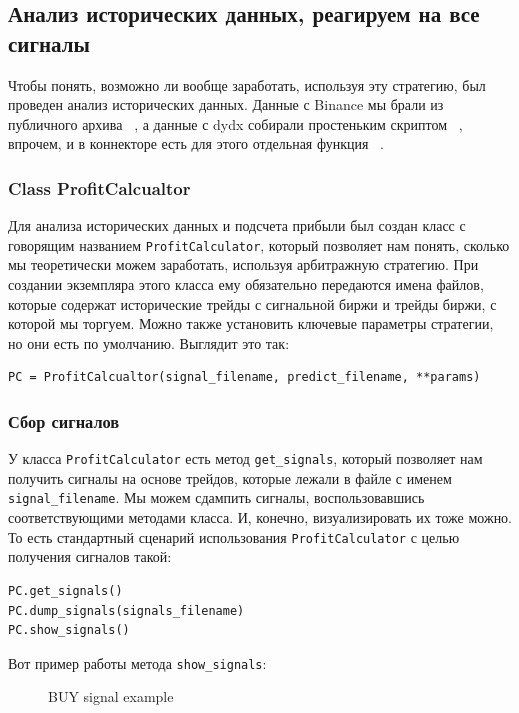 \subsection{Анализ исторических данных, реагируем на все сигналы}
Чтобы понять, возможно ли вообще заработать, используя эту стратегию, был проведен анализ исторических данных. Данные с Binance мы брали из публичного архива ~\cite{BinanceArchive}, а данные с dydx собирали простеньким скриптом ~\cite{DyDxCollectData}, впрочем, и в коннекторе есть для этого отдельная функция ~\cite{DyDxCollectDataConnector}.

\subsubsection{Class ProfitCalcualtor}
Для анализа исторических данных и подсчета прибыли был создан класс с говорящим названием \texttt{ProfitCalculator}, который позволяет нам понять, сколько мы теоретически можем заработать, используя арбитражную стратегию. При создании экземпляра этого класса ему обязательно передаются имена файлов, которые содержат исторические трейды с сигнальной биржи и трейды биржи, с которой мы торгуем. Можно также установить ключевые параметры стратегии, но они есть по умолчанию. Выглядит это так:
\begin{verbatim}
PC = ProfitCalcualtor(signal_filename, predict_filename, **params)
\end{verbatim}

\subsubsection{Сбор сигналов}
У класса \texttt{ProfitCalculator} есть метод \texttt{get\_signals}, который позволяет нам получить сигналы на основе трейдов, которые лежали в файле с именем \texttt{signal\_filename}. Мы можем сдампить сигналы, воспользовавшись соответствующими методами класса. И, конечно, визуализировать их тоже можно. То есть стандартный сценарий использования \texttt{ProfitCalculator} с целью получения сигналов такой:
\begin{verbatim}
PC.get_signals()
PC.dump_signals(signals_filename)
PC.show_signals()
\end{verbatim}

Вот пример работы метода \texttt{show\_signals}:
\begin{figure}[H]
\caption{BUY signal example}
\label{fig:image}
\end{figure}

